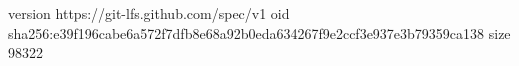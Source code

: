 version https://git-lfs.github.com/spec/v1
oid sha256:e39f196cabe6a572f7dfb8e68a92b0eda634267f9e2ccf3e937e3b79359ca138
size 98322
